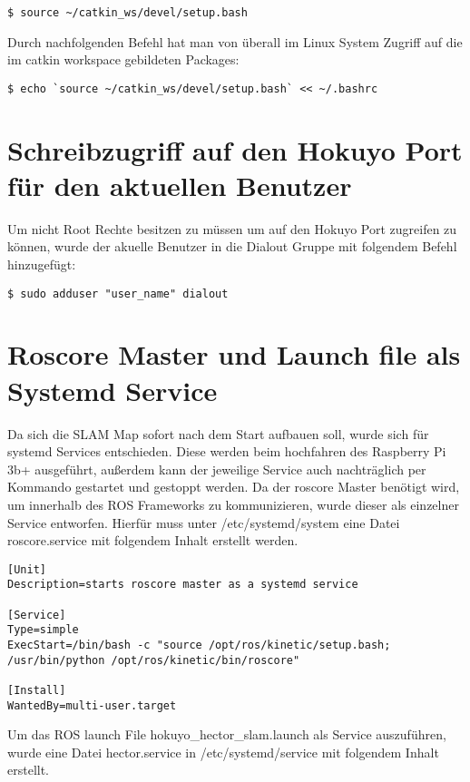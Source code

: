 \begin{lstlisting}
$ source ~/catkin_ws/devel/setup.bash
\end{lstlisting}

Durch nachfolgenden Befehl hat man von überall im Linux System Zugriff auf die im catkin workspace gebildeten Packages:\\ 

\begin{lstlisting}
$ echo `source ~/catkin_ws/devel/setup.bash` << ~/.bashrc
\end{lstlisting}

\section{Schreibzugriff auf den Hokuyo Port für den aktuellen Benutzer}
Um nicht Root Rechte besitzen zu müssen um auf den Hokuyo Port zugreifen zu können, wurde der akuelle Benutzer in die Dialout Gruppe mit folgendem Befehl hinzugefügt:\\

\begin{lstlisting}
$ sudo adduser "user_name" dialout
\end{lstlisting}

\section{Roscore Master und Launch file als Systemd Service}
Da sich die SLAM Map sofort nach dem Start aufbauen soll, wurde sich für systemd Services entschieden. Diese werden beim hochfahren des Raspberry Pi 3b+ ausgeführt, außerdem kann der jeweilige Service auch nachträglich per Kommando gestartet und gestoppt werden. 
Da der roscore Master benötigt wird, um innerhalb des ROS Frameworks zu kommunizieren, wurde dieser als einzelner Service entworfen. Hierfür muss unter /etc/systemd/system eine Datei roscore.service mit folgendem Inhalt erstellt werden.\\


\begin{lstlisting}
[Unit]
Description=starts roscore master as a systemd service

[Service]
Type=simple
ExecStart=/bin/bash -c "source /opt/ros/kinetic/setup.bash; /usr/bin/python /opt/ros/kinetic/bin/roscore"

[Install]
WantedBy=multi-user.target
\end{lstlisting}

Um das ROS launch File hokuyo\_hector\_slam.launch als Service auszuführen, wurde eine Datei hector.service in /etc/systemd/service mit folgendem Inhalt erstellt.\\

